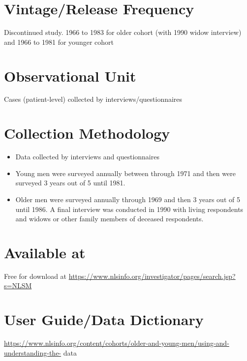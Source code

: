 \documentclass[
]{book}
\providecommand{\tightlist}{%
  \setlength{\itemsep}{0pt}\setlength{\parskip}{0pt}}
\begin{document}
\hypertarget{vintagerelease-frequency-56}{%
\section{Vintage/Release Frequency}\label{vintagerelease-frequency-56}}

Discontinued study. 1966 to 1983 for older cohort (with 1990 widow interview) and 1966 to 1981 for younger cohort

\hypertarget{observational-unit-56}{%
\section{Observational Unit}\label{observational-unit-56}}

Cases (patient-level) collected by interviews/questionnaires

\hypertarget{collection-methodology-56}{%
\section{Collection Methodology}\label{collection-methodology-56}}

\begin{itemize}
\tightlist
\item
  Data collected by interviews and questionnaires
\item
  Young men were surveyed annually between through 1971 and then were surveyed 3 years out of 5 until 1981.
\item
  Older men were surveyed annually through 1969 and then 3 years out of 5 until 1986. A final interview was conducted in 1990 with living respondents and widows or other family members of deceased respondents.
\end{itemize}

\hypertarget{available-at-56}{%
\section{Available at}\label{available-at-56}}

Free for download at \url{https://www.nlsinfo.org/investigator/pages/search.jsp?s=NLSM}

\hypertarget{user-guidedata-dictionary-56}{%
\section{User Guide/Data Dictionary}\label{user-guidedata-dictionary-56}}

\url{https://www.nlsinfo.org/content/cohorts/older-and-young-men/using-and-understanding-the-} data
\end{document}
